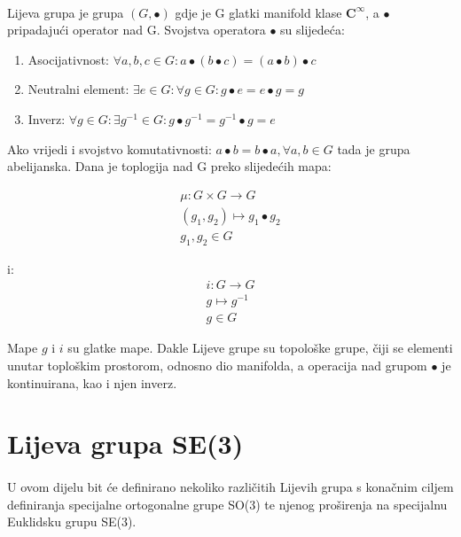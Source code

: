 \documentclass[times, utf8, diplomski]{fer}
\begin{document}
	\paragraph{} Lijeva grupa je grupa $(G, \bullet)$ gdje je G glatki manifold klase $\boldsymbol{C}^\infty$, a $\bullet$ pripadajući operator nad G. Svojstva operatora $\bullet$ su slijedeća: 
	\begin{enumerate}
		\item Asocijativnost: $\forall a, b, c \in G :  a\bullet(b\bullet c) = (a\bullet b) \bullet c$
		\item Neutralni element: $\exists e \in G : \forall g \in G : g \bullet e = e \bullet g = g$
		\item Inverz: $\forall g \in G : \exists g^{-1} \in G : g \bullet g^{-1} = g^{-1} \bullet g = e$
	\end{enumerate}
	Ako vrijedi i svojstvo komutativnosti: $a \bullet b = b \bullet a, \forall a, b \in G$ tada je grupa abelijanska. Dana je toplogija nad G preko slijedećih mapa:
	
	\begin{gather}
		\mu: G \times G \rightarrow G \\
		(g_1, g_2) \mapsto g_1 \bullet g_2 \\ g_1, g_2 \in G
	\end{gather}
	
	i: 
	\begin{gather}
		i: G \rightarrow G \\
		g \mapsto g^{-1} \\
		g \in G
	\end{gather}
	
	Mape $g$ i $i$ su glatke mape. Dakle Lijeve grupe su topološke grupe, čiji se elementi unutar toploškim prostorom, odnosno dio manifolda, a operacija nad grupom $\bullet$ je kontinuirana, kao i njen inverz.

	\newpage
	\clearpage
	
\section{Lijeva grupa SE(3)}

	\paragraph{}U ovom dijelu bit će definirano nekoliko različitih Lijevih grupa s konačnim ciljem definiranja specijalne ortogonalne grupe SO(3) te njenog proširenja na specijalnu Euklidsku grupu SE(3). 	
	
\end{document}

